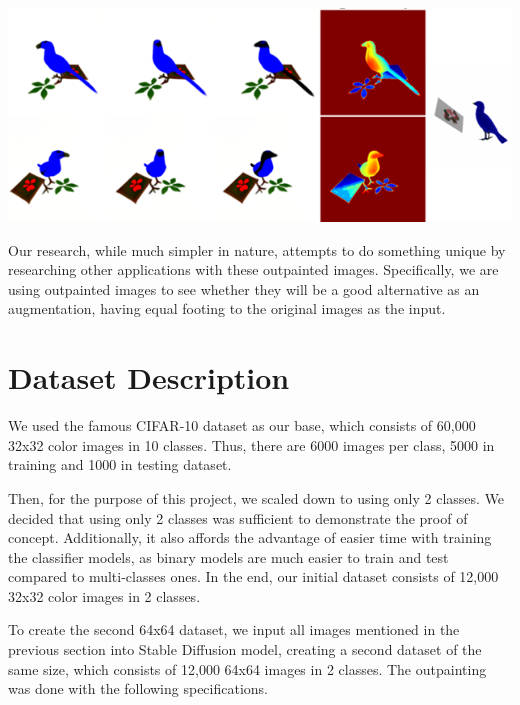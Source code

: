 \documentclass[conference]{IEEEtran}
\begin{document}
\includegraphics[scale=0.5]{Research.png}

Our research, while much simpler in nature, attempts to do something unique by researching other applications with these outpainted images. Specifically, we are using outpainted images to see whether they will be a good alternative as an augmentation, having equal footing to the original images as the input.

\section{Dataset Description}\label{dd}

We used the famous CIFAR-10 dataset as our base, which consists of 60,000 32x32 color images in 10 classes. Thus, there are 6000 images per class, 5000 in training and 1000 in testing dataset.

Then, for the purpose of this project, we scaled down to using only 2 classes. We decided that using only 2 classes was sufficient to demonstrate the proof of concept. Additionally, it also affords the advantage of easier time with training the classifier models, as binary models are much easier to train and test compared to multi-classes ones. In the end, our initial dataset consists of 12,000 32x32 color images in 2 classes.

To create the second 64x64 dataset, we input all images mentioned in the previous section into Stable Diffusion model, creating a second dataset of the same size, which consists of 12,000 64x64 images in 2 classes. The outpainting was done with the following specifications.
\end{document}
